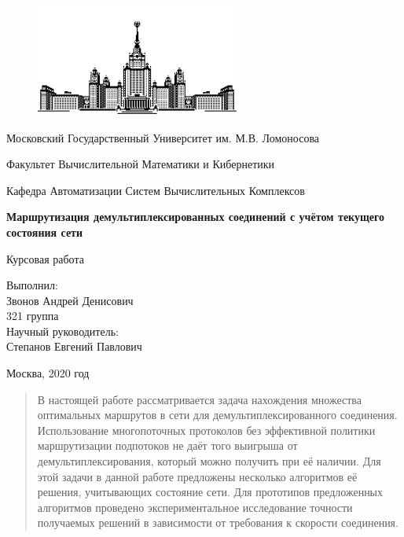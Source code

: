 \documentclass[a4paper]{article}
\begin{document}
\begin{titlepage}
\thispagestyle{empty}

\begin{center}
\begin{figure}[htbp]
  \centering
  \includegraphics[width=0.6\textwidth]{msu}
\end{figure}


Московский Государственный Университет им. М.В. Ломоносова

Факультет Вычислительной Математики и Кибернетики

Кафедра Автоматизации Систем Вычислительных Комплексов

\vfill
\textbf{\Huge Маршрутизация демультиплексированных соединений с учётом текущего состояния сети}

\vfill
{\huge Курсовая работа}
\end{center}

\vfill
\begin{flushright}
{\large Выполнил:\\Звонов Андрей Денисович\\321 группа\\}
\vspace{0.5cm}
{\large Научный руководитель:\\Степанов Евгений Павлович}
\end{flushright}

\vfill
\centerline{Москва, 2020 год}

\end{titlepage}
\linespread{1.5}
\setcounter{page}{2}
\large

\begin{abstract}
\large
В настоящей работе рассматривается задача нахождения множества оптимальных маршрутов в сети для демультиплексированного соединения. Использование многопоточных протоколов без эффективной политики маршрутизации подпотоков не даёт того выигрыша от демультиплексирования, который можно получить при её наличии.
Для этой задачи в данной работе предложены несколько алгоритмов её решения, учитывающих состояние сети. Для прототипов предложенных алгоритмов проведено экспериментальное исследование точности получаемых решений в зависимости от требования к скорости соединения.

\end{abstract}
\newpage
\end{document}
